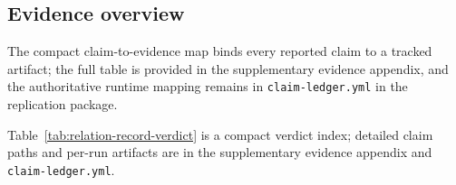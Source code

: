 \documentclass[preprint,12pt,authoryear]{elsarticle}
\begin{document}
\subsection{Evidence overview}
\label{subsec:claim-evidence-map}

The compact claim-to-evidence map binds every reported claim to a tracked artifact; the full table is provided in the supplementary evidence appendix, and the authoritative runtime mapping remains in \texttt{claim-ledger.yml} in the replication package.

\label{subsec:relation-record-verdict-map}

Table~\ref{tab:relation-record-verdict} is a compact verdict index; detailed claim paths and per-run artifacts are in the supplementary evidence appendix and \texttt{claim-ledger.yml}.
\end{document}
